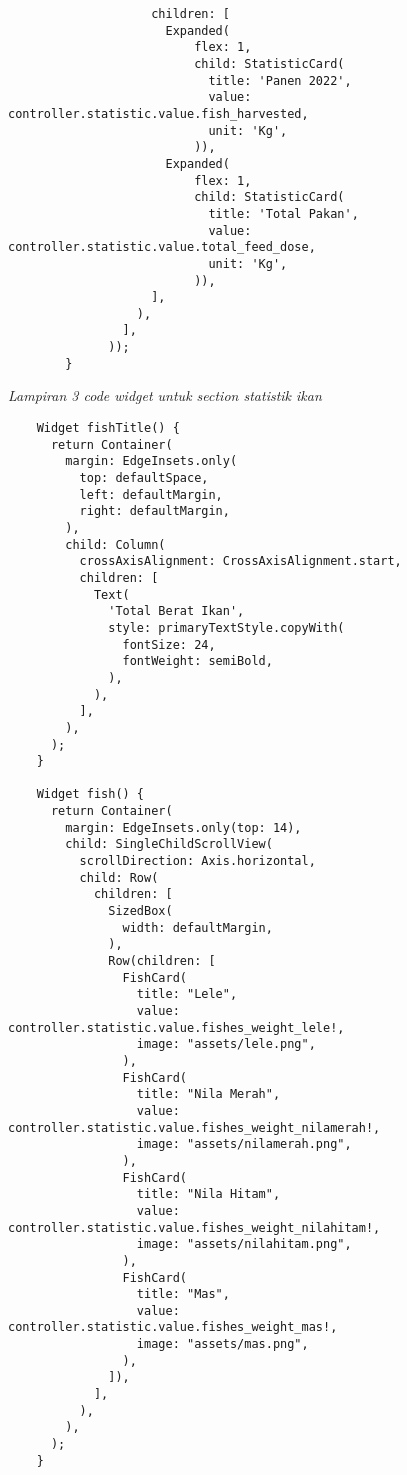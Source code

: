 \begin{lstlisting}
	                children: [
	                  Expanded(
	                      flex: 1,
	                      child: StatisticCard(
	                        title: 'Panen 2022',
	                        value: controller.statistic.value.fish_harvested,
	                        unit: 'Kg',
	                      )),
	                  Expanded(
	                      flex: 1,
	                      child: StatisticCard(
	                        title: 'Total Pakan',
	                        value: controller.statistic.value.total_feed_dose,
	                        unit: 'Kg',
	                      )),
	                ],
	              ),
	            ],
	          ));
	    }
	\end{lstlisting}
	

\textit{Lampiran 3 code widget untuk section statistik ikan}
\begin{lstlisting}
	Widget fishTitle() {
	  return Container(
		margin: EdgeInsets.only(
		  top: defaultSpace,
		  left: defaultMargin,
		  right: defaultMargin,
		),
		child: Column(
		  crossAxisAlignment: CrossAxisAlignment.start,
		  children: [
			Text(
			  'Total Berat Ikan',
			  style: primaryTextStyle.copyWith(
				fontSize: 24,
				fontWeight: semiBold,
			  ),
			),
		  ],
		),
	  );
	}

	Widget fish() {
	  return Container(
		margin: EdgeInsets.only(top: 14),
		child: SingleChildScrollView(
		  scrollDirection: Axis.horizontal,
		  child: Row(
			children: [
			  SizedBox(
				width: defaultMargin,
			  ),
			  Row(children: [
				FishCard(
				  title: "Lele",
				  value: controller.statistic.value.fishes_weight_lele!,
				  image: "assets/lele.png",
				),
				FishCard(
				  title: "Nila Merah",
				  value: controller.statistic.value.fishes_weight_nilamerah!,
				  image: "assets/nilamerah.png",
				),
				FishCard(
				  title: "Nila Hitam",
				  value: controller.statistic.value.fishes_weight_nilahitam!,
				  image: "assets/nilahitam.png",
				),
				FishCard(
				  title: "Mas",
				  value: controller.statistic.value.fishes_weight_mas!,
				  image: "assets/mas.png",
				),
			  ]),
			],
		  ),
		),
	  );
	}
\end{lstlisting}



